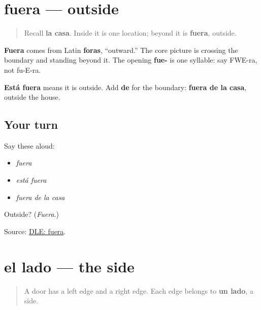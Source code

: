 \section[fuera]{fuera — outside}

\label{lesson:ES-C407-fuera}



\begin{quote}
Recall \textbf{la casa}. Inside it is one location; beyond it is \textbf{fuera}, outside.
\end{quote}

\begin{cousinweb}
\textbf{Fuera} comes from Latin \textbf{foras}, “outward.” The core picture is crossing the boundary and standing beyond it. The opening \textbf{fue-} is one syllable: say FWE-ra, not fu-E-ra.
\end{cousinweb}

\begin{grammarlens}[title={Grammar Lens: fuera and fuera de}]
\textbf{Está fuera} means it is outside. Add \textbf{de} for the boundary: \textbf{fuera de la casa}, outside the house.
\end{grammarlens}

\subsection*{Your turn}
Say these aloud:

\begin{itemize}
\raggedright
  \item \emph{fuera}
  \item \emph{está fuera}
  \item \emph{fuera de la casa}
\end{itemize}

\begin{tcolorbox}[breakable,colback=teal!4,colframe=teal!35!black,title={Before you move on}]
Outside? (\emph{Fuera}.)

Source: \href{https://dle.rae.es/fuera}{DLE: fuera}.
\end{tcolorbox}
\section[el lado]{el lado — the side}

\label{lesson:ES-C407-lado}



\begin{quote}
A door has a left edge and a right edge. Each edge belongs to \textbf{un lado}, a side.
\end{quote}

